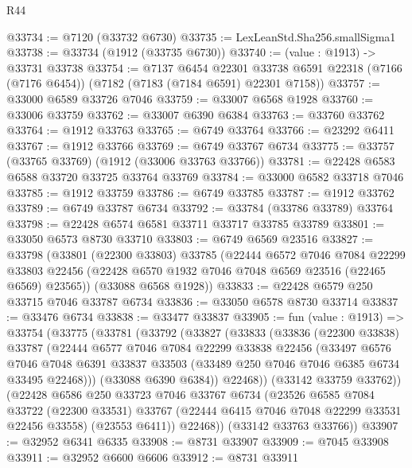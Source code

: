 \begin{lexlean}{R44}
\begin{coremodule}
{@33734 := @7120 (@33732 @6730)
@33735 := LexLeanStd.Sha256.smallSigma1
@33738 := @33734 (@1912 (@33735 @6730))
@33740 := (value : @1913) -> @33731 @33738
@33754 := @7137
    @6454
    @22301
    @33738
    @6591
    @22318
    (@7166 (@7176 @6454))
    (@7182 (@7183 (@7184 @6591) @22301 @7158))
@33757 := @33000 @6589 @33726 @7046
@33759 := @33007 @6568 @1928
@33760 := @33006 @33759
@33762 := @33007 @6390 @6384
@33763 := @33760 @33762
@33764 := @1912 @33763
@33765 := @6749 @33764
@33766 := @23292 @6411
@33767 := @1912 @33766
@33769 := @6749 @33767 @6734
@33775 := @33757 (@33765 @33769) (@1912 (@33006 @33763 @33766))
@33781 := @22428 @6583 @6588 @33720 @33725 @33764 @33769
@33784 := @33000 @6582 @33718 @7046
@33785 := @1912 @33759
@33786 := @6749 @33785
@33787 := @1912 @33762
@33789 := @6749 @33787 @6734
@33792 := @33784 (@33786 @33789) @33764
@33798 := @22428 @6574 @6581 @33711 @33717 @33785 @33789
@33801 := @33050 @6573 @8730 @33710
@33803 := @6749 @6569 @23516
@33827 := @33798
    (@33801
      (@22300 @33803)
      @33785
      (@22444
        @6572
        @7046
        @7084
        @22299
        @33803
        @22456
        (@22428 @6570 @1932 @7046 @7048 @6569 @23516 (@22465 @6569) @23565))
      (@33088 @6568 @1928))
@33833 := @22428 @6579 @250 @33715 @7046 @33787 @6734
@33836 := @33050 @6578 @8730 @33714
@33837 := @33476 @6734
@33838 := @33477 @33837
@33905 := fun (value : @1913) =>
  @33754
    (@33775
      (@33781
        (@33792
          (@33827
            (@33833
              (@33836
                (@22300 @33838)
                @33787
                (@22444
                  @6577
                  @7046
                  @7084
                  @22299
                  @33838
                  @22456
                  (@33497
                    @6576
                    @7046
                    @7048
                    @6391
                    @33837
                    @33503
                    (@33489 @250 @7046 @7046 @6385 @6734 @33495 @22468)))
                (@33088 @6390 @6384))
              @22468))
          (@33142 @33759 @33762))
        (@22428
          @6586
          @250
          @33723
          @7046
          @33767
          @6734
          (@23526
            @6585
            @7084
            @33722
            (@22300 @33531)
            @33767
            (@22444 @6415 @7046 @7048 @22299 @33531 @22456 @33558)
            (@23553 @6411))
          @22468))
      (@33142 @33763 @33766))
@33907 := @32952 @6341 @6335
@33908 := @8731 @33907
@33909 := @7045 @33908
@33911 := @32952 @6600 @6606
@33912 := @8731 @33911
}
\end{coremodule}
\end{lexlean}
